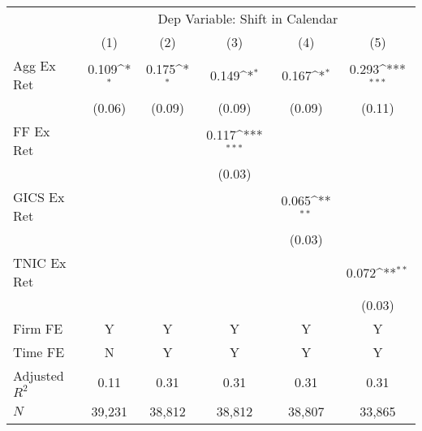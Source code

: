          {         \def\sym#1{\ifmmode^{#1}\else\(^{#1}\)\fi}         \begin{tabular}{l*{5}{c}}         \toprule          &\multicolumn{5}{c}{Dep Variable: Shift in Calendar} \\         \cmidrule(lr){2-6}           &\multicolumn{1}{c}{(1)}&\multicolumn{1}{c}{(2)} &\multicolumn{1}{c}{(3)}         &\multicolumn{1}{c}{(4)}        &\multicolumn{1}{c}{(5)} \\         
\midrule
Agg Ex Ret  &       0.109\sym{*}  &       0.175\sym{*}  &       0.149\sym{*}  &       0.167\sym{*}  &       0.293\sym{***}\\
            &      (0.06)         &      (0.09)         &      (0.09)         &      (0.09)         &      (0.11)         \\
FF Ex Ret   &                     &                     &       0.117\sym{***}&                     &                     \\
            &                     &                     &      (0.03)         &                     &                     \\
GICS Ex Ret &                     &                     &                     &       0.065\sym{**} &                     \\
            &                     &                     &                     &      (0.03)         &                     \\
TNIC Ex Ret &                     &                     &                     &                     &       0.072\sym{**} \\
            &                     &                     &                     &                     &      (0.03)         \\
         \cmidrule(lr){1-6}          \multicolumn{1}{l}{Firm FE} & Y&Y&Y&Y&Y \\         \multicolumn{1}{l}{Time FE} & N&Y&Y&Y&Y \\         
Adjusted $R^2$&        0.11         &        0.31         &        0.31         &        0.31         &        0.31         \\
$N$         &      39,231         &      38,812         &      38,812         &      38,807         &      33,865         \\
\bottomrule                         \end{tabular}                         }
